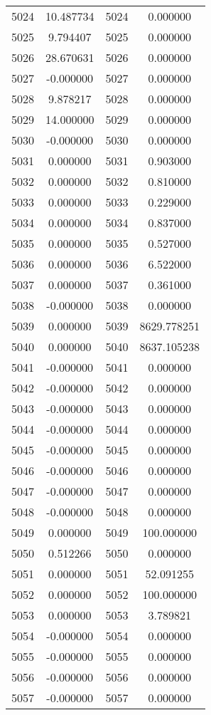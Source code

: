 \documentclass[12pt]{article}
\begin{document}
\begin{longtable}{@{}cccc@{}}
5024 & 10.487734 & 5024 & 0.000000 \\
5025 & 9.794407 & 5025 & 0.000000 \\
5026 & 28.670631 & 5026 & 0.000000 \\
5027 & -0.000000 & 5027 & 0.000000 \\
5028 & 9.878217 & 5028 & 0.000000 \\
5029 & 14.000000 & 5029 & 0.000000 \\
5030 & -0.000000 & 5030 & 0.000000 \\
5031 & 0.000000 & 5031 & 0.903000 \\
5032 & 0.000000 & 5032 & 0.810000 \\
5033 & 0.000000 & 5033 & 0.229000 \\
5034 & 0.000000 & 5034 & 0.837000 \\
5035 & 0.000000 & 5035 & 0.527000 \\
5036 & 0.000000 & 5036 & 6.522000 \\
5037 & 0.000000 & 5037 & 0.361000 \\
5038 & -0.000000 & 5038 & 0.000000 \\
5039 & 0.000000 & 5039 & 8629.778251 \\
5040 & 0.000000 & 5040 & 8637.105238 \\
5041 & -0.000000 & 5041 & 0.000000 \\
5042 & -0.000000 & 5042 & 0.000000 \\
5043 & -0.000000 & 5043 & 0.000000 \\
5044 & -0.000000 & 5044 & 0.000000 \\
5045 & -0.000000 & 5045 & 0.000000 \\
5046 & -0.000000 & 5046 & 0.000000 \\
5047 & -0.000000 & 5047 & 0.000000 \\
5048 & -0.000000 & 5048 & 0.000000 \\
5049 & 0.000000 & 5049 & 100.000000 \\
5050 & 0.512266 & 5050 & 0.000000 \\
5051 & 0.000000 & 5051 & 52.091255 \\
5052 & 0.000000 & 5052 & 100.000000 \\
5053 & 0.000000 & 5053 & 3.789821 \\
5054 & -0.000000 & 5054 & 0.000000 \\
5055 & -0.000000 & 5055 & 0.000000 \\
5056 & -0.000000 & 5056 & 0.000000 \\
5057 & -0.000000 & 5057 & 0.000000 \\

\end{longtable}
\end{document}
